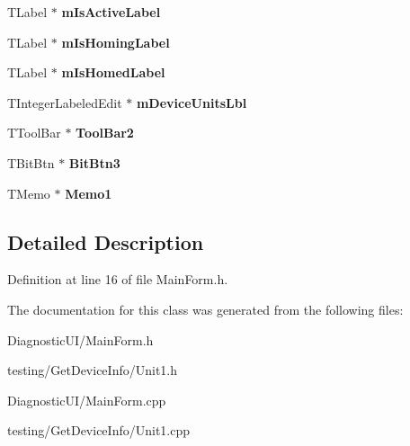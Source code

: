 \begin{DoxyCompactItemize}
\item 
T\+Label $\ast$ {\bfseries m\+Is\+Active\+Label}\hypertarget{class_t_main_a2654ddc6a658ecebd38cea95ac05fda2}{}\label{class_t_main_a2654ddc6a658ecebd38cea95ac05fda2}

\item 
T\+Label $\ast$ {\bfseries m\+Is\+Homing\+Label}\hypertarget{class_t_main_a63253df7a0c19d9a24ee61fd8e14bdd6}{}\label{class_t_main_a63253df7a0c19d9a24ee61fd8e14bdd6}

\item 
T\+Label $\ast$ {\bfseries m\+Is\+Homed\+Label}\hypertarget{class_t_main_a586c01b03a7ee18269615b95d11cd33d}{}\label{class_t_main_a586c01b03a7ee18269615b95d11cd33d}

\item 
T\+Integer\+Labeled\+Edit $\ast$ {\bfseries m\+Device\+Units\+Lbl}\hypertarget{class_t_main_aab816399c863ba78873ac73d7ebc9989}{}\label{class_t_main_aab816399c863ba78873ac73d7ebc9989}

\item 
T\+Tool\+Bar $\ast$ {\bfseries Tool\+Bar2}\hypertarget{class_t_main_ad835e2947e968076e332ff098549568f}{}\label{class_t_main_ad835e2947e968076e332ff098549568f}

\item 
T\+Bit\+Btn $\ast$ {\bfseries Bit\+Btn3}\hypertarget{class_t_main_afda63287d28886eb5b771a5bd663276d}{}\label{class_t_main_afda63287d28886eb5b771a5bd663276d}

\item 
T\+Memo $\ast$ {\bfseries Memo1}\hypertarget{class_t_main_aed4374362adbd2e12dd8f8a2880c8162}{}\label{class_t_main_aed4374362adbd2e12dd8f8a2880c8162}

\end{DoxyCompactItemize}


\subsection{Detailed Description}


Definition at line 16 of file Main\+Form.\+h.



The documentation for this class was generated from the following files\+:\begin{DoxyCompactItemize}
\item 
Diagnostic\+U\+I/Main\+Form.\+h\item 
testing/\+Get\+Device\+Info/Unit1.\+h\item 
Diagnostic\+U\+I/Main\+Form.\+cpp\item 
testing/\+Get\+Device\+Info/Unit1.\+cpp\end{DoxyCompactItemize}
